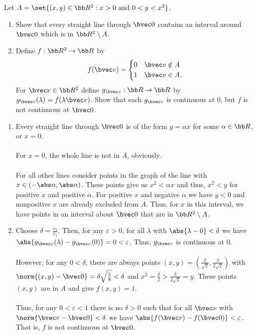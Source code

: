 \documentclass[12pt, letterpaper]{hmcpset}
\begin{document}
\begin{problem}[26]
	Let $A = \set{(x, y) \in \bb R^2 : x > 0 \text{ and } 0 < y < x^2 }$.
	\begin{enumerate}
		\item Show that every straight line through $\bvec 0$ contains an interval around $\bvec 0$ which is in $\bb R^2 \setminus A$.
		\item Define $f : \bb R^2 \to \bb R$ by
			\[
				f(\bvec v) = \begin{cases}
					0 & \bvec v \notin A \\
					1 & \bvec v \in A.
				\end{cases}
			\]
			For $\bvec v \in \bb R^2$ define $g_{\bvec v} : \bb R \to \bb R$ by $g_{\bvec v}(\lambda) = f(\lambda \bvec v)$. Show that each $g_{\bvec v}$ is continuous at $0$, but $f$ is not continuous at $\bvec 0$.
	\end{enumerate}
\end{problem}

\begin{solution}
	\begin{enumerate}
		\item Every straight line through $\bvec 0$ is of the form $y = \alpha x$ for some $\alpha \in \bb R$, or $x = 0$.\\\\
			For $x = 0$, the whole line is not in $A$, obviously. \\\\
			For all other lines consider points in the graph of the line with $x \in (-\abs \alpha, \abs \alpha)$. These points give us $x^2 < \alpha x$ and thus, $x^2 < y$ for positive $x$ and positive $\alpha$. For positive $x$ and negative $\alpha$ we have $y < 0$ and nonpositive $x$ are already excluded from $A$. Thus, for $x$ in this interval, we have points in an interval about $\bvec 0$ that are in $\bb R^2 \setminus A$.
		\item Choose $\delta = \frac{v_2}{v_1}$. Then, for any $\varepsilon > 0$, for all $\lambda$ with $\abs{\lambda - 0} < \delta$ we have $\abs{g_{\bvec v}(\lambda) - g_{\bvec v}(0)} = 0 < \varepsilon$. Thus, $g_{\bvec v}$ is continuous at $0$.\\\\
			However, for any $0 < \delta$, there are always points $(x, y) = (\frac{\delta}{\sqrt 2}, \frac{\delta}{2 \sqrt 2})$ with $\norm{(x, y) - \bvec 0} = \delta \sqrt{\frac{5}{8}} < \delta$ and $x^2 = \frac{\delta}{2} > \frac{\delta}{2 \sqrt 2} = y$. These points $(x, y)$ are in $A$ and give $f(x,y) = 1$.\\\\
			Thus, for any $0 < \varepsilon < 1$ there is no $\delta > 0$ such that for all $\bvec v$ with $\norm{\bvec v - \bvec 0} < \delta$ we have $\abs{f(\bvec v) - f(\bvec 0)} < \varepsilon$. That is, $f$ is not continuous at $\bvec 0$.
	\end{enumerate}
\end{solution}
\end{document}
